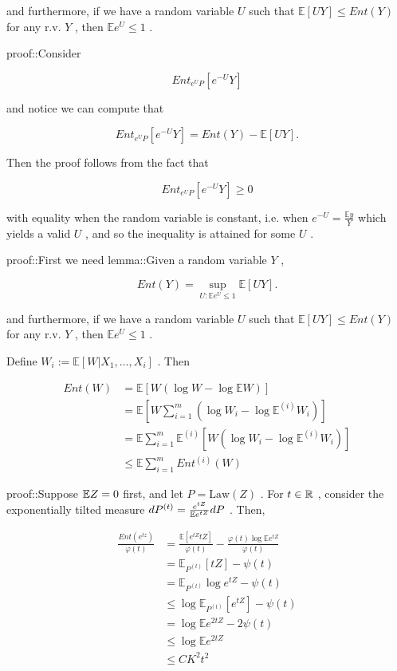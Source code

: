 \documentclass{article}
\begin{document}
and furthermore, if we have a random variable  $U$  such that  $\mathbb{E}[UY] \leq Ent(Y)$  for any r.v.  $Y$ , then  $\mathbb{E}e^U\leq 1$ .

 proof::Consider


\begin{equation*}
Ent_{e^{U}P}[e^{-U}Y]
\end{equation*}

and notice we can compute that


\begin{equation*}
Ent_{e^{U}P}[e^{-U}Y] = Ent(Y) - \mathbb{E}[UY].
\end{equation*}

Then the proof follows from the fact that


\begin{equation*}
Ent_{e^{U}P}[e^{-U}Y] \geq 0
\end{equation*}

with equality when the random variable is constant, i.e. when  $e^{-U} = \frac{\mathbb{E}y}{Y}$  which yields a valid  $U$ , and so the inequality is attained for some  $U$ .

 proof::First we need lemma::Given a random variable  $Y$ ,


\begin{equation*}
Ent(Y) = \sup_{U: \mathbb{E} e^U \leq 1}\mathbb{E}[UY].
\end{equation*}

and furthermore, if we have a random variable  $U$  such that  $\mathbb{E}[UY] \leq Ent(Y)$  for any r.v.  $Y$ , then  $\mathbb{E}e^U\leq 1$ .

 Define  $W_i := \mathbb{E}[W| X_1, \dots, X_i]$ . Then


\begin{align*}
Ent(W) &= \mathbb{E}\left[ W (\log W - \log \mathbb{E}W) \right]\\
& = \mathbb{E}\left[ W \sum_{i=1}^m (\log W_i - \log\mathbb{E}^{(i)} W_i) \right]\\
& = \mathbb{E} \sum_{i=1}^m \mathbb{E}^{(i)}[W (\log W_i - \log \mathbb{E}^{(i)} W_i)]\\
& \leq \mathbb{E} \sum_{i=1}^m Ent^{(i)}(W)
\end{align*}


proof::Suppose  $\mathbb{E} Z = 0$  first, and let  $P = \mathrm{Law}(Z)$ . For  $t\in \mathbb{R}$ , consider the exponentially tilted measure  $dP^{(t)} = \frac{e^{tZ}}{\mathbb{E} e^{tZ}} dP$ . Then,


\begin{align*}
\frac{Ent(e^{tz})}{\varphi(t)} &= \frac{\mathbb{E}[e^{tZ}tZ]}{\varphi(t)} - \frac{\varphi(t)\log \mathbb{E}e^{tZ}}{\varphi(t)} \\
& = \mathbb{E}_{P^{(t)}}[tZ] - \psi(t) \\
& = \mathbb{E}_{P^{(t)}} \log e^{tZ} - \psi(t) \\
& \leq \log \mathbb{E}_{P^{(t)}} [e^{tZ}] - \psi(t) \\
& = \log \mathbb{E} e^{2tZ} - 2 \psi(t) \\
& \leq \log \mathbb{E} e^{2tZ} \\
& \leq CK^2t^2
\end{align*}
\end{document}
